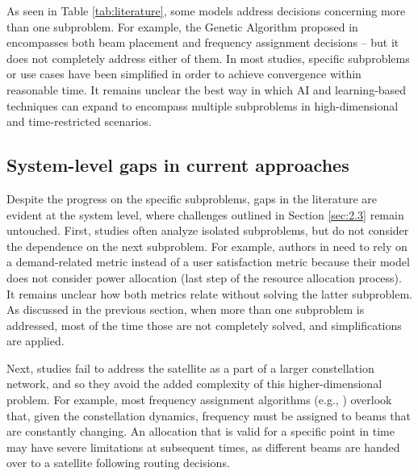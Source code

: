 \documentclass[letterpaper]{article} %
\begin{document}
As seen in Table \ref{tab:literature}, some models address decisions concerning more than one subproblem. For example, the Genetic Algorithm proposed in \cite{Angeletti2006} encompasses both beam placement and frequency assignment decisions -- but it does not completely address either of them. In most studies, specific subproblems or use cases have been simplified in order to achieve convergence within reasonable time. It remains unclear the best way in which AI and learning-based techniques can expand to encompass multiple subproblems in high-dimensional and time-restricted scenarios.




\subsection{System-level gaps in current approaches}


Despite the progress on the specific subproblems, gaps in the literature are evident at the system level, where challenges outlined in Section \ref{sec:2.3} remain untouched. First, studies often analyze isolated subproblems, but do not consider the dependence on the next subproblem. For example, authors in \cite{Camino2014} need to rely on a demand-related metric instead of a user satisfaction metric because their model does not consider power allocation (last step of the resource allocation process). It remains unclear how both metrics relate without solving the latter subproblem. As discussed in the previous section, when more than one subproblem is addressed, most of the time those are not completely solved, and simplifications are applied.

Next, studies fail to address the satellite as a part of a larger constellation network, and so they avoid the added complexity of this higher-dimensional problem. For example, most frequency assignment algorithms (e.g., \cite{vidal2020joint, liao2020distributed}) overlook that, given the constellation dynamics, frequency must be assigned to beams that are constantly changing. An allocation that is valid for a specific point in time may have severe limitations at subsequent times, as different beams are handed over to a satellite following routing decisions.
\end{document}
